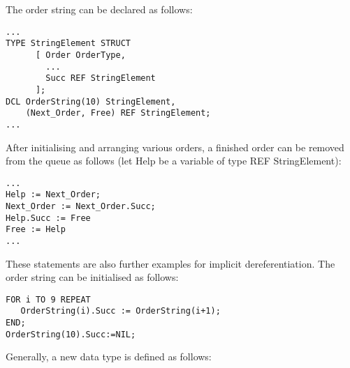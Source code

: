 \begin{enumerate}
\begin{minipage}{\linewidth}
The order string can be declared as follows:

\begin{lstlisting}
...
TYPE StringElement STRUCT 
      [ Order OrderType,
        ...
        Succ REF StringElement
      ];
DCL OrderString(10) StringElement,
    (Next_Order, Free) REF StringElement;
...
\end{lstlisting}
\end{minipage}

After initialising and arranging various orders, a finished order can be
removed from the queue as follows (let Help be a variable of type REF
StringElement):

\begin{lstlisting}
...
Help := Next_Order;
Next_Order := Next_Order.Succ;
Help.Succ := Free
Free := Help
...
\end{lstlisting}
These statements are also further examples for implicit
dereferentiation. The order string can be initialised as follows:

\begin{lstlisting}
FOR i TO 9 REPEAT
   OrderString(i).Succ := OrderString(i+1);
END;
OrderString(10).Succ:=NIL;
\end{lstlisting}
\end{enumerate}

Generally, a new data type is defined as follows:

